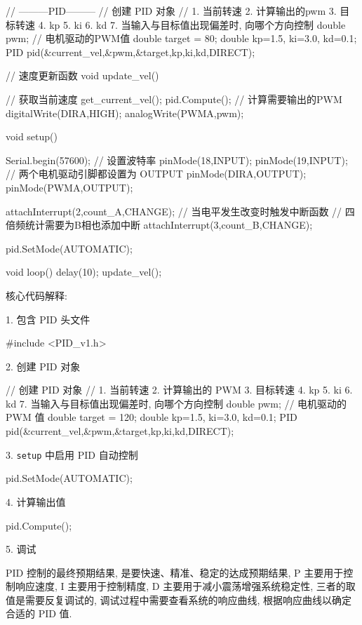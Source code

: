\documentclass[openany, fontset=windowsold]{ctexbook}
\theoremstyle{kaiti}
\theoremstyle{normal}
\begin{document}
\begin{cpp}
  // ---------PID---------
  // 创建 PID 对象
  // 1. 当前转速 2. 计算输出的pwm 3. 目标转速 4. kp 5. ki 6. kd 7. 当输入与目标值出现偏差时, 向哪个方向控制
  double pwm; // 电机驱动的PWM值
  double target = 80;
  double kp=1.5, ki=3.0, kd=0.1;
  PID pid(&current_vel,&pwm,&target,kp,ki,kd,DIRECT);

  // 速度更新函数
  void update_vel(){
    // 获取当前速度
    get_current_vel();
    pid.Compute(); // 计算需要输出的PWM
    digitalWrite(DIRA,HIGH);
    analogWrite(PWMA,pwm);

  }

  void setup() {
    Serial.begin(57600); // 设置波特率  
    pinMode(18,INPUT);
    pinMode(19,INPUT);
    // 两个电机驱动引脚都设置为 OUTPUT
    pinMode(DIRA,OUTPUT);
    pinMode(PWMA,OUTPUT);

    attachInterrupt(2,count_A,CHANGE); // 当电平发生改变时触发中断函数
    // 四倍频统计需要为B相也添加中断
    attachInterrupt(3,count_B,CHANGE);

    pid.SetMode(AUTOMATIC);
  }

  void loop() {
    delay(10);
    update_vel();
  }
\end{cpp}

核心代码解释:

1. 包含 PID 头文件

\begin{cpp}
  #include <PID_v1.h>
\end{cpp}

2. 创建 PID 对象

\begin{cpp}
  // 创建 PID 对象
  // 1. 当前转速 2. 计算输出的 PWM 3. 目标转速 4. kp 5. ki 6. kd 7. 当输入与目标值出现偏差时, 向哪个方向控制
  double pwm; // 电机驱动的 PWM 值
  double target = 120;
  double kp=1.5, ki=3.0, kd=0.1;
  PID pid(&current_vel,&pwm,&target,kp,ki,kd,DIRECT);
\end{cpp}

3. \verb|setup| 中启用 PID 自动控制

\begin{cpp}
  pid.SetMode(AUTOMATIC);
\end{cpp}

4. 计算输出值

\begin{cpp}
  pid.Compute();
\end{cpp}

5. 调试

PID 控制的最终预期结果, 是要快速、精准、稳定的达成预期结果, P 主要用于控制响应速度, I 主要用于控制精度, D 主要用于减小震荡增强系统稳定性, 三者的取值是需要反复调试的, 调试过程中需要查看系统的响应曲线, 根据响应曲线以确定合适的 PID 值.
\end{document}
